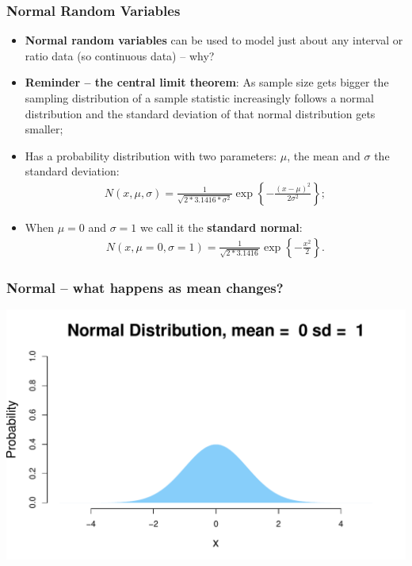 \documentclass[aspectratio=169]{beamer}
\theoremstyle{principle}
\begin{document}
\begin{frame}
\frametitle{Normal Random Variables}

\begin{itemize}
\item \textbf{Normal random variables} can be used to model just about any interval or ratio data (so continuous data) -- why?
\bigskip

\item \textbf{Reminder -- the central limit theorem}: As sample size gets bigger the sampling distribution of a sample statistic increasingly follows a normal distribution and the standard deviation of that normal distribution gets smaller;
\bigskip

\item Has a probability distribution with two parameters: $\mu$, the mean and $\sigma$ the standard deviation:
\begin{align*}
N(x,\mu,\sigma) = \frac{1}{\sqrt{2*3.1416*\sigma^2}}\exp\left\{-\frac{(x - \mu)^2}{2\sigma^2}\right\};
\end{align*}

\item When $\mu = 0$ and $\sigma = 1$ we call it the \textbf{standard normal}:
\begin{align*}
N(x,\mu=0,\sigma=1) = \frac{1}{\sqrt{2*3.1416}}\exp\left\{-\frac{x^2}{2}\right\}.
\end{align*}

\end{itemize}

\end{frame}

\begin{frame}
\frametitle{Normal -- what happens as mean changes?}

\begin{center}
\includegraphics[scale=0.5]{Normal_0_1.pdf}
\end{center}

\end{frame}
\end{document}
